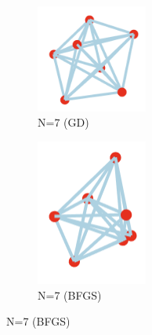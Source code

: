 \documentclass[11pt,onecolumn]{article}
\begin{document}
\begin{figure}[h]
  \begin{subfigure}[b]{0.4\textwidth}
    \centering
    \includegraphics[width=0.4\textwidth]{N7.png}
    \caption{N=7 (GD)}
    \label{fig:sub3}
  \end{subfigure}
  \hfill
  \begin{subfigure}[b]{0.4\textwidth}
    \centering
    \includegraphics[width=0.4\textwidth]{N7_2.png}
    \caption{N=7 (BFGS)}
    \label{fig:sub4}
  \end{subfigure}

  \vspace{0.5em}


\end{figure}
\end{document}
